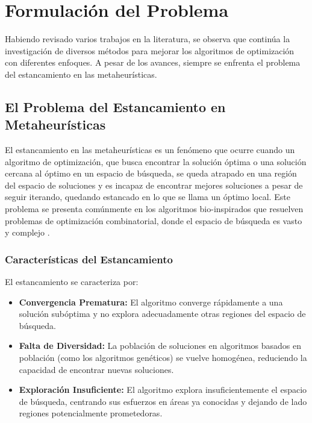 

\section{Formulación del Problema}
\label{sc:FP}

Habiendo revisado varios trabajos en la literatura, se observa que continúa la investigación de diversos métodos para mejorar los algoritmos de optimización con diferentes enfoques. A pesar de los avances, siempre se enfrenta el problema del estancamiento en las metaheurísticas.


\subsection{El Problema del Estancamiento en Metaheurísticas}

El estancamiento en las metaheurísticas es un fenómeno que ocurre cuando un algoritmo de optimización, que busca encontrar la solución óptima o una solución cercana al óptimo en un espacio de búsqueda, se queda atrapado en una región del espacio de soluciones y es incapaz de encontrar mejores soluciones a pesar de seguir iterando, quedando estancado en lo que se llama un óptimo local. Este problema se presenta comúnmente en los algoritmos bio-inspirados que resuelven problemas de optimización combinatorial, donde el espacio de búsqueda es vasto y complejo \cite{10.5555/1718024, Michalewicz2004}.

\subsubsection{Características del Estancamiento}

El estancamiento se caracteriza por:
\begin{itemize}
    \item \textbf{Convergencia Prematura:} El algoritmo converge rápidamente a una solución subóptima y no explora adecuadamente otras regiones del espacio de búsqueda.
    \item \textbf{Falta de Diversidad:} La población de soluciones en algoritmos basados en población (como los algoritmos genéticos) se vuelve homogénea, reduciendo la capacidad de encontrar nuevas soluciones.
    \item \textbf{Exploración Insuficiente:} El algoritmo explora insuficientemente el espacio de búsqueda, centrando sus esfuerzos en áreas ya conocidas y dejando de lado regiones potencialmente prometedoras.
\end{itemize}

